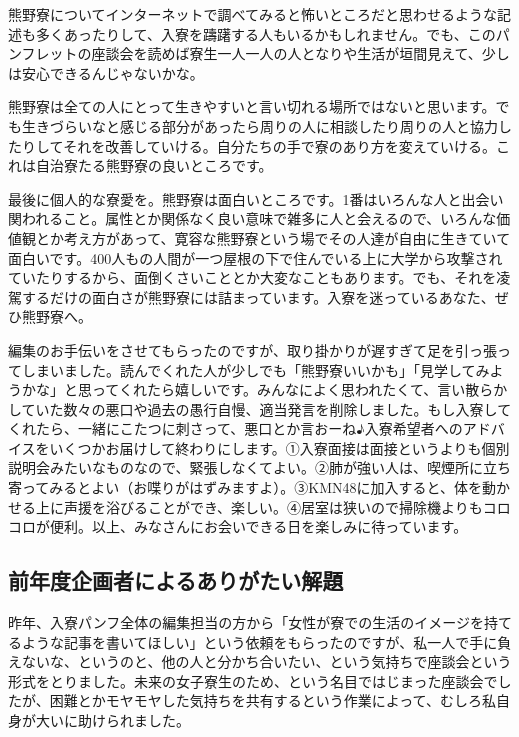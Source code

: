 熊野寮についてインターネットで調べてみると怖いところだと思わせるような記述も多くあったりして、入寮を躊躇する人もいるかもしれません。でも、このパンフレットの座談会を読めば寮生一人一人の人となりや生活が垣間見えて、少しは安心できるんじゃないかな。

熊野寮は全ての人にとって生きやすいと言い切れる場所ではないと思います。でも生きづらいなと感じる部分があったら周りの人に相談したり周りの人と協力したりしてそれを改善していける。自分たちの手で寮のあり方を変えていける。これは自治寮たる熊野寮の良いところです。

最後に個人的な寮愛を。熊野寮は面白いところです。1番はいろんな人と出会い関われること。属性とか関係なく良い意味で雑多に人と会えるので、いろんな価値観とか考え方があって、寛容な熊野寮という場でその人達が自由に生きていて面白いです。400人もの人間が一つ屋根の下で住んでいる上に大学から攻撃されていたりするから、面倒くさいこととか大変なこともあります。でも、それを凌駕するだけの面白さが熊野寮には詰まっています。入寮を迷っているあなた、ぜひ熊野寮へ。





編集のお手伝いをさせてもらったのですが、取り掛かりが遅すぎて足を引っ張ってしまいました。読んでくれた人が少しでも「熊野寮いいかも」「見学してみようかな」と思ってくれたら嬉しいです。みんなによく思われたくて、言い散らかしていた数々の悪口や過去の愚行自慢、適当発言を削除しました。もし入寮してくれたら、一緒にこたつに刺さって、悪口とか言おーね♪入寮希望者へのアドバイスをいくつかお届けして終わりにします。①入寮面接は面接というよりも個別説明会みたいなものなので、緊張しなくてよい。②肺が強い人は、喫煙所に立ち寄ってみるとよい（お喋りがはずみますよ）。③KMN48に加入すると、体を動かせる上に声援を浴びることができ、楽しい。④居室は狭いので掃除機よりもコロコロが便利。以上、みなさんにお会いできる日を楽しみに待っています。





\subsection{前年度企画者によるありがたい解題}



昨年、入寮パンフ全体の編集担当の方から「女性が寮での生活のイメージを持てるような記事を書いてほしい」という依頼をもらったのですが、私一人で手に負えないな、というのと、他の人と分かち合いたい、という気持ちで座談会という形式をとりました。未来の女子寮生のため、という名目ではじまった座談会でしたが、困難とかモヤモヤした気持ちを共有するという作業によって、むしろ私自身が大いに助けられました。

